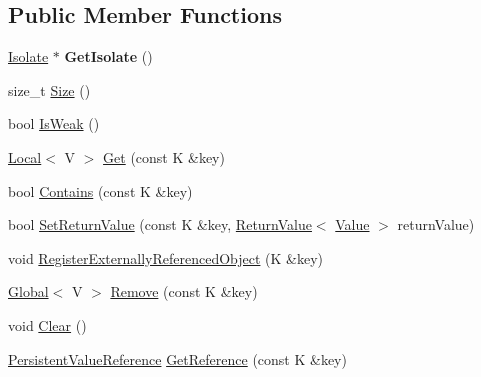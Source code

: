 \subsection*{Public Member Functions}
\begin{DoxyCompactItemize}
\item 
\mbox{\label{classv8_1_1PersistentValueMapBase_a80da7adc6e8bdb166912075346116978}} 
\mbox{\hyperlink{classv8_1_1Isolate}{Isolate}} $\ast$ {\bfseries Get\+Isolate} ()
\item 
size\+\_\+t \mbox{\hyperlink{classv8_1_1PersistentValueMapBase_ade5c5db2a968fdabe073649e85b837eb}{Size}} ()
\item 
bool \mbox{\hyperlink{classv8_1_1PersistentValueMapBase_a9f824b13dd30605589508db2740dd678}{Is\+Weak}} ()
\item 
\mbox{\hyperlink{classv8_1_1Local}{Local}}$<$ V $>$ \mbox{\hyperlink{classv8_1_1PersistentValueMapBase_a16b8f906ea42036c2f37d44813bf2a72}{Get}} (const K \&key)
\item 
bool \mbox{\hyperlink{classv8_1_1PersistentValueMapBase_a8c68e5f99c4042541c6d32232c97282a}{Contains}} (const K \&key)
\item 
bool \mbox{\hyperlink{classv8_1_1PersistentValueMapBase_a85201649d2bbd0ffdebe8be3d5c6447a}{Set\+Return\+Value}} (const K \&key, \mbox{\hyperlink{classv8_1_1ReturnValue}{Return\+Value}}$<$ \mbox{\hyperlink{classv8_1_1Value}{Value}} $>$ return\+Value)
\item 
void \mbox{\hyperlink{classv8_1_1PersistentValueMapBase_a7d1cd63172b997dfaac9d0f009edd709}{Register\+Externally\+Referenced\+Object}} (K \&key)
\item 
\mbox{\hyperlink{classv8_1_1Global}{Global}}$<$ V $>$ \mbox{\hyperlink{classv8_1_1PersistentValueMapBase_abd75a4c050416712167ba0bb9eace097}{Remove}} (const K \&key)
\item 
void \mbox{\hyperlink{classv8_1_1PersistentValueMapBase_a1bf074e7a7c24713c9a3d40ddce89e74}{Clear}} ()
\item 
\mbox{\hyperlink{classv8_1_1PersistentValueMapBase_1_1PersistentValueReference}{Persistent\+Value\+Reference}} \mbox{\hyperlink{classv8_1_1PersistentValueMapBase_a52e74c69b94c7ce77a65af9f32d68af4}{Get\+Reference}} (const K \&key)
\end{DoxyCompactItemize}
